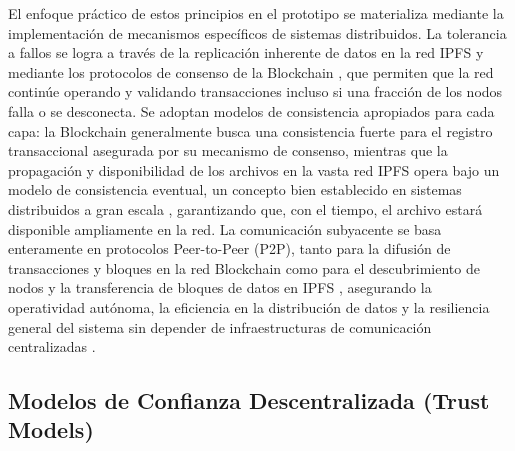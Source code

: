 El enfoque práctico de estos principios en el prototipo se materializa mediante la implementación de mecanismos específicos de sistemas distribuidos. La tolerancia a fallos se logra a través de la replicación inherente de datos en la red IPFS \parencite{benet2014ipfs} y mediante los protocolos de consenso de la Blockchain \parencite{nakamoto2008bitcoin,antonopoulos2023mastering}, que permiten que la red continúe operando y validando transacciones incluso si una fracción de los nodos falla o se desconecta. Se adoptan modelos de consistencia apropiados para cada capa: la Blockchain generalmente busca una consistencia fuerte para el registro transaccional asegurada por su mecanismo de consenso, mientras que la propagación y disponibilidad de los archivos en la vasta red IPFS opera bajo un modelo de consistencia eventual, un concepto bien establecido en sistemas distribuidos a gran escala \parencite{vogels2008eventually, vanSteen2017}, garantizando que, con el tiempo, el archivo estará disponible ampliamente en la red. La comunicación subyacente se basa enteramente en protocolos Peer-to-Peer (P2P), tanto para la difusión de transacciones y bloques en la red Blockchain \parencite{nakamoto2008bitcoin} como para el descubrimiento de nodos y la transferencia de bloques de datos en IPFS \parencite{benet2014ipfs}, asegurando la operatividad autónoma, la eficiencia en la distribución de datos y la resiliencia general del sistema sin depender de infraestructuras de comunicación centralizadas \parencite{coulouris2011}. 

  

\subsection{Modelos de Confianza Descentralizada (Trust Models)} 


